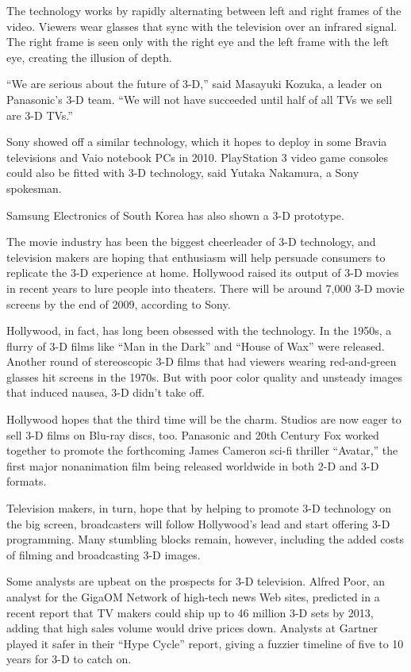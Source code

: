 ﻿\documentclass[12pt]{article}
\begin{document}
The technology works by rapidly alternating between left and right frames of the video. Viewers wear
glasses that sync with the television over an infrared signal. The right frame is seen only with the
right eye and the left frame with the left eye, creating the illusion of depth.

``We are serious about the future of 3-D,'' said Masayuki Kozuka, a leader on Panasonic's 3-D team.
``We will not have succeeded until half of all TVs we sell are 3-D TVs.''

Sony showed off a similar technology, which it hopes to deploy in some Bravia televisions and Vaio
notebook PCs in 2010. PlayStation 3 video game consoles could also be fitted with 3-D technology,
said Yutaka Nakamura, a Sony spokesman.

Samsung Electronics of South Korea has also shown a 3-D prototype.

The movie industry has been the biggest cheerleader of 3-D technology, and television makers are
hoping that enthusiasm will help persuade consumers to replicate the 3-D experience at home.
Hollywood raised its output of 3-D movies in recent years to lure people into theaters. There will
be around 7,000 3-D movie screens by the end of 2009, according to Sony.

Hollywood, in fact, has long been obsessed with the technology. In the 1950s, a flurry of 3-D films
like ``Man in the Dark'' and ``House of Wax'' were released. Another round of stereoscopic 3-D films
that had viewers wearing red-and-green glasses hit screens in the 1970s. But with poor color quality
and unsteady images that induced nausea, 3-D didn't take off.

Hollywood hopes that the third time will be the charm. Studios are now eager to sell 3-D films on
Blu-ray discs, too. Panasonic and 20th Century Fox worked together to promote the forthcoming James
Cameron sci-fi thriller ``Avatar,'' the first major nonanimation film being released worldwide in
both 2-D and 3-D formats.

Television makers, in turn, hope that by helping to promote 3-D technology on the big screen,
broadcasters will follow Hollywood's lead and start offering 3-D programming. Many stumbling blocks
remain, however, including the added costs of filming and broadcasting 3-D images.

Some analysts are upbeat on the prospects for 3-D television. Alfred Poor, an analyst for the GigaOM
Network of high-tech news Web sites, predicted in a recent report that TV makers could ship up to 46
million 3-D sets by 2013, adding that high sales volume would drive prices down. Analysts at Gartner
played it safer in their ``Hype Cycle'' report, giving a fuzzier timeline of five to 10 years for
3-D to catch on.
\end{document}

